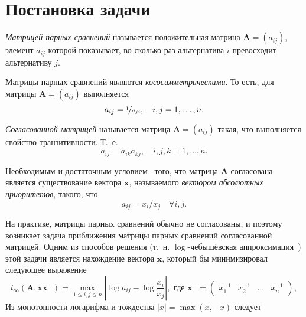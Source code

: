 \documentclass[specialist,
	substylefile = spbu.rtx,
	subf,href,colorlinks=true, 12pt]{disser}
\begin{document}
\section{Постановка задачи}
\begin{definition}{\textit{Матрицей парных сравнений}}
	называется положительная матрица $\mathbf{A} = (a_{ij})$, элемент $a_{ij}$ которой показывает, во сколько раз альтернатива $i$ превосходит альтернативу $j$.
\end{definition}
\begin{remark}
	Матрицы парных сравнений являются \textit{кососимметрическими}. То есть, для матрицы $\mathbf{A} = (a_{ij})$ выполняется
	\[
	a_{ij} = \nicefrac{1}{a_{ji}}, \quad i,j = 1,\dots,n.
	\]
\end{remark}
\begin{definition}{\textit{Согласованной матрицей}}
	называется матрица $\mathbf{A} = (a_{ij})$ такая, что выполняется свойство транзитивности. Т.~е.
	\[
		a_{ij} = a_{ik}a_{kj}, \quad i,j,k = 1,\dots,n.
	\]
\end{definition}

\begin{utv}
	Необходимым и достаточным условием~\cite{saaty1984} того, что матрица $\mathbf{A}$
	согласована является существование вектора $\mathbf{x}$, называемого \textit{вектором абсолютных приоритетов}, такого, что
	\[
		a_{ij} = x_{i}/x_{j} \quad \forall i, j.
	\]
\end{utv}
На практике, матрицы парных сравнений обычно не согласованы, и поэтому возникает задача приближения матрицы парных сравнений согласованной матрицей.
Одним из способов решения (т.~н. $\log$-чебышёвская аппроксимация~\cite{krivulin2019}) этой задачи является нахождение вектора $\mathbf{x}$, который бы минимизировал следующее выражение
\[
	l_{\infty}\left(\mathbf{A}, \mathbf{x} \mathbf{x}^{-}\right)=\max _{1 \leq i, j \leq n}\left|\log a_{i j}-\log \frac{x_{i}}{x_{j}}\right|, \text{ где } \mathbf{x}^{-} = \begin{pmatrix}x_1^{-1}&x_2^{-1} & \dots & x_n^{-1}\end{pmatrix},
\]
Из монотонности логарифма и тождества $|x| = \max(x, -x)$ следует
\end{document}
